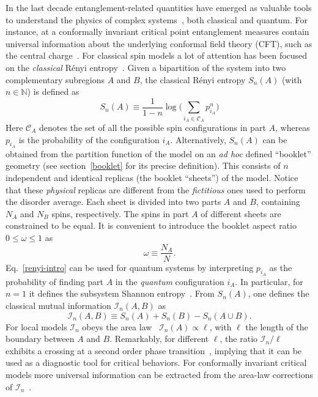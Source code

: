 \documentclass[twocolumn,superscriptaddress,prb,10pt]{revtex4-1}
\begin{document}
In the last decade entanglement-related quantities have emerged as valuable tools to 
understand the physics of complex systems~\cite{amico-2008,eisert-2009,calabrese-2009,
cc-rev}, both classical and quantum. For instance, at a conformally invariant critical 
point entanglement measures contain universal information about the underlying 
conformal field theory (CFT), such as the central charge~\cite{holzhey-1994,vidal-2003,
calabrese-2004,calabrese-2012}. For classical spin models a lot of attention has been 
focused on the \emph{classical} R\'enyi entropy~\cite{jaconis-2013,stephan-2014}. Given 
a bipartition of the system into two complementary subregions $A$ and $B$, the classical 
R\'enyi entropy $S_n(A)$ (with $n\in\mathbb{N}$) is defined as 
%
\begin{equation}
S_n(A)\equiv \frac{1}{1-n}\log\Big(\sum\limits_{i_A\in{\mathcal C}_A} p^n_{i_A}
\Big)
\label{renyi-intro}
\end{equation}
%
Here ${\mathcal C}_A$ denotes the set of all the possible spin configurations in part 
$A$, whereas $p_{i_A}$ is the probability of the configuration $i_A$. 
Alternatively, $S_n(A)$ can be obtained from the partition function of the model on 
an \emph{ad hoc} defined ``booklet'' geometry (see section~\ref{booklet} for its 
precise definition). This consists of $n$ independent and identical replicas (the 
booklet ``sheets'') of the model. Notice that these \emph{physical} replicas are different 
from the \emph{fictitious} ones used to perform the disorder average. Each sheet is 
divided into two parts $A$ and $B$, containing $N_A$ and $N_B$ spins, respectively. 
The spins in part $A$ of different sheets are constrained to be equal. It is 
convenient to introduce the booklet aspect ratio $0\le\omega\le1$ as  
%
\begin{equation}
\label{a-ratio}
\omega\equiv \frac{N_A}{N}.
\end{equation}
%
Eq.~\eqref{renyi-intro} can be used for quantum systems by interpreting $p_{i_A}$ as 
the probability of finding part $A$ in the \emph{quantum} configuration $i_A$. In particular, 
for $n=1$ it defines the subsystem Shannon entropy~\cite{alcaraz-2013,stephan-2014-a}. 
From $S_n(A)$, one defines the classical mutual information ${\mathcal I}_n(A,B)$ 
as 
%
\begin{equation}
{\mathcal I}_n(A,B)\equiv S_n(A)+S_n(B)-S_n(A\cup B). 
\end{equation}
%
For local models ${\mathcal I}_n$ obeys the area law~\cite{wolf-2008} ${\mathcal I}_n(A)
\propto\ell$, with $\ell$ the length of the boundary between $A$ and $B$. Remarkably, 
for different $\ell$, the ratio ${\mathcal I}_n/\ell$ exhibits a crossing at a second 
order phase transition~\cite{jaconis-2013}, implying that it can be used as a diagnostic 
tool for critical behaviors. For conformally invariant critical models more universal 
information can be extracted from the area-law corrections of ${\mathcal I}_n$~\cite{stephan-2014}. 
\end{document}
